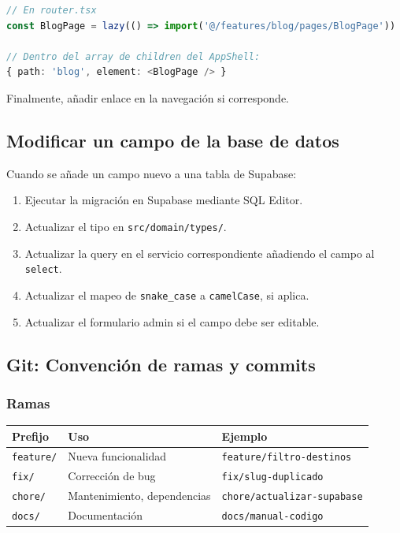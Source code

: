 \documentclass[12pt,letterpaper]{article}
\newcommand{\code}[1]{\texttt{#1}}
\begin{document}
\begin{lstlisting}[language=typescript]
// En router.tsx
const BlogPage = lazy(() => import('@/features/blog/pages/BlogPage'))

// Dentro del array de children del AppShell:
{ path: 'blog', element: <BlogPage /> }
\end{lstlisting}

Finalmente, añadir enlace en la navegación si corresponde.

\subsection{Modificar un campo de la base de datos}

Cuando se añade un campo nuevo a una tabla de Supabase:

\begin{enumerate}
    \item Ejecutar la migración en Supabase mediante SQL Editor.
    \item Actualizar el tipo en \code{src/domain/types/}.
    \item Actualizar la query en el servicio correspondiente añadiendo el campo al \code{select}.
    \item Actualizar el mapeo de \code{snake\_case} a \code{camelCase}, si aplica.
    \item Actualizar el formulario admin si el campo debe ser editable.
\end{enumerate}

\subsection{Git: Convención de ramas y commits}

\subsubsection*{Ramas}

\begin{longtable}{p{} p{} p{}}
\toprule
\textbf{Prefijo} & \textbf{Uso} & \textbf{Ejemplo} \\
\midrule
\code{feature/} & Nueva funcionalidad & \code{feature/filtro-destinos} \\
\code{fix/} & Corrección de bug & \code{fix/slug-duplicado} \\
\code{chore/} & Mantenimiento, dependencias & \code{chore/actualizar-supabase} \\
\code{docs/} & Documentación & \code{docs/manual-codigo} \\
\bottomrule
\end{longtable}
\end{document}
